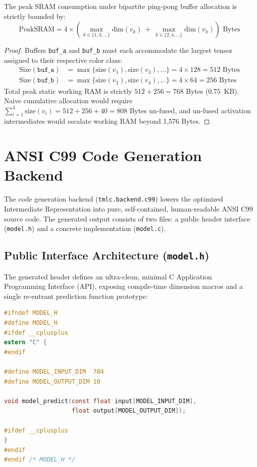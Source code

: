 \documentclass[11pt,a4paper]{article}
\begin{document}
\begin{theorem}
The peak SRAM consumption under bipartite ping-pong buffer allocation is strictly bounded by:
\begin{equation}
\text{PeakSRAM} = 4 \times \left( \max_{k \in \{1, 3, \dots\}} \text{dim}(v_k) \ + \ \max_{k \in \{2, 4, \dots\}} \text{dim}(v_k) \right) \text{ Bytes}
\end{equation}
\end{theorem}

\begin{proof}
Buffers \texttt{buf\_a} and \texttt{buf\_b} must each accommodate the largest tensor assigned to their respective color class:
\begin{align}
\text{Size}(\texttt{buf\_a}) &= \max \{ \text{size}(v_1), \text{size}(v_3), \dots \} = 4 \times 128 = 512 \text{ Bytes} \\
\text{Size}(\texttt{buf\_b}) &= \max \{ \text{size}(v_2), \text{size}(v_4), \dots \} = 4 \times 64 = 256 \text{ Bytes}
\end{align}
Total peak static working RAM is strictly $512 + 256 = 768$ Bytes ($0.75$~KB). Naive cumulative allocation would require $\sum_{i=1}^3 \text{size}(v_i) = 512 + 256 + 40 = 808$ Bytes un-fused, and un-fused activation intermediates would escalate working RAM beyond 1,576 Bytes.
\end{proof}

\section{ANSI C99 Code Generation Backend}
\label{sec:codegen}

The code generation backend (\texttt{tmlc.backend.c99}) lowers the optimized Intermediate Representation into pure, self-contained, human-readable ANSI C99 source code. The generated output consists of two files: a public header interface (\texttt{model.h}) and a concrete implementation (\texttt{model.c}).

\subsection{Public Interface Architecture (\texttt{model.h})}
The generated header defines an ultra-clean, minimal C Application Programming Interface (API), exposing compile-time dimension macros and a single re-entrant prediction function prototype:
\begin{lstlisting}[language=C, basicstyle=\ttfamily\footnotesize, frame=single]
#ifndef MODEL_H
#define MODEL_H
#ifdef __cplusplus
extern "C" {
#endif

#define MODEL_INPUT_DIM  784
#define MODEL_OUTPUT_DIM 10

void model_predict(const float input[MODEL_INPUT_DIM], 
                   float output[MODEL_OUTPUT_DIM]);

#ifdef __cplusplus
}
#endif
#endif /* MODEL_H */
\end{lstlisting}
\end{document}
